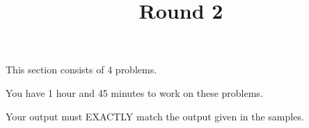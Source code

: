 \documentclass{../codeproblem}
\begin{document}
\title{Round 2}
This section consists of 4 problems.

You have 1 hour and 45 minutes to work on these problems.

Your output must EXACTLY match the output given in the samples.





\end{document}
